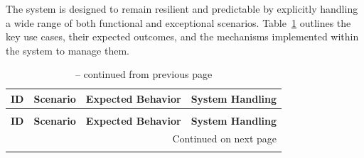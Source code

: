 The system is designed to remain resilient and predictable by explicitly handling a wide range of both functional and exceptional scenarios. 
Table~\ref{tab:use-cases} outlines the key use cases, their expected outcomes, and the mechanisms implemented within the system to manage them.
\begin{longtable}{|p{1cm}|p{3.2cm}|p{4cm}|p{6.4cm}|}

\caption{System Use Cases and Handling Mechanisms.}
\label{tab:use-cases} \\

\hline
\textbf{ID} & \textbf{Scenario} & \textbf{Expected Behavior} & \textbf{System Handling} \\
\hline
\endfirsthead

\caption[]{-- continued from previous page} \\
\hline
\textbf{ID} & \textbf{Scenario} & \textbf{Expected Behavior} & \textbf{System Handling} \\
\hline
\endhead

\hline 
\multicolumn{4}{r}{{Continued on next page}} \\ 
\endfoot

\hline
\endlastfoot


\end{longtable}
